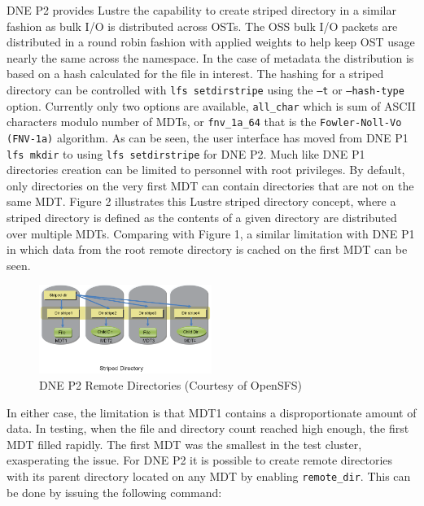 \documentclass[conference,compsoc]{IEEEtran}
\begin{document}
DNE P2 provides Lustre the capability to create striped directory in a
similar fashion as bulk I/O is distributed across OSTs. The OSS bulk I/O
packets are distributed in a round robin fashion with applied weights to help
keep OST usage nearly the same across the namespace. In the case of metadata
the distribution is based on a hash calculated for the file in interest. 
The hashing for a striped directory can be controlled with
{\footnotesize{\texttt{lfs setdirstripe}}} using the
{\footnotesize{\texttt{–t}}} or {\footnotesize{\texttt{--hash-type}}} option.
Currently only two options are available, {\footnotesize{\texttt{all\_char}}}
which is sum of ASCII characters modulo number of MDTs, or
{\footnotesize{\texttt{fnv\_1a\_64}}} that is the
{\footnotesize{\texttt{Fowler-Noll-Vo (FNV-1a)}}} algorithm. As can be seen,
the user interface has moved from DNE P1
{\footnotesize{\texttt{lfs mkdir}}} to using {\footnotesize{\texttt{lfs
setdirstripe}}}  for DNE P2. Much like DNE P1 directories creation can be
limited to personnel with root privileges. By default, only directories on the
very first MDT can contain directories that are not on the same MDT. Figure 2
illustrates this Lustre striped directory concept, where a striped directory is
defined as the contents of a given directory are distributed over multiple
MDTs. Comparing with Figure 1, a similar limitation with DNE P1
in which data from the root remote directory is cached on the first MDT can be seen.

\begin{figure}[!ht]
  \centering
    \includegraphics[width=0.5\textwidth]{figs/dnep2}
  \caption{DNE P2 Remote Directories (Courtesy of OpenSFS)}
\end{figure}

In either case, the limitation is that MDT1 contains a disproportionate
amount of data. In testing, when the file and directory count reached high 
enough, the first MDT filled rapidly. The first MDT was the smallest in the
test cluster, exasperating the issue.  For DNE P2 it is possible to
create remote directories with its parent directory located on any MDT
by enabling {\footnotesize{\texttt{remote\_dir}}}. This can be done by issuing the following command:
\end{document}
